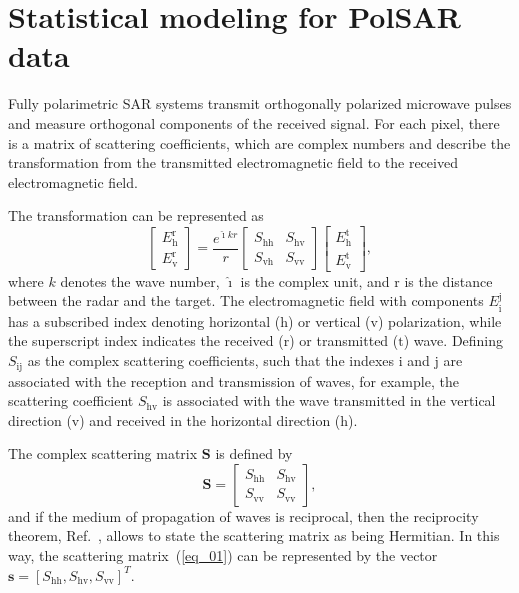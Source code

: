 \documentclass[conference]{IEEEtran}
\begin{document}
\section{Statistical modeling for PolSAR data}\label{sec_02}

Fully polarimetric SAR systems transmit orthogonally polarized microwave pulses and measure orthogonal components of the received signal. 
For each pixel, there is a matrix of scattering coefficients, which are complex numbers and describe the transformation from the transmitted electromagnetic field to the received electromagnetic field.

The transformation can be represented as
\begin{equation*}
 \left[
\begin{array}{c}
	E_{\text{h}}^{\text{r}}   \\
	E_{\text{v}}^{\text{r}}    
\end{array}
\right]
 = \frac{e^{\hat{\imath} kr}}{r}\left[
\begin{array}{cc}
	S_\text{hh}   & S_\text{hv}   \\
	S_\text{vh}   & S_\text{vv}   
\end{array}
\right]
 \left[
\begin{array}{c}
	E_{\text{h}}^{\text{t}}   \\
	E_{\text{v}}^{\text{t}}    
\end{array}
\right],
\end{equation*}
where $k$ denotes the wave number, $\hat{\imath}$ is the complex unit, and $\text{r}$ is the distance between the radar and the target. 
The electromagnetic field with components $E_{\text{i}}^{\text{j}}$ has a subscribed index denoting horizontal ($\text{h}$) or vertical ($\text{v}$) polarization, while the superscript index indicates the received ($\text{r}$) or transmitted ($\text{t}$) wave. 
Defining $S_\text{ij}$ as the complex scattering coefficients, such that the indexes $\text{i}$ and $\text{j}$ are associated with the reception and transmission of waves, for example, the scattering coefficient $S_\text{hv}$ is associated with the wave transmitted in the vertical direction ($\text{v}$) and received in the horizontal direction ($\text{h}$).

The complex scattering matrix $\mathbf{S}$ is defined by
\begin{equation}
\mathbf{S} = \left[
\begin{array}{cc}
	S_\text{hh}   & S_\text{hv}   \\
	S_\text{vv}   & S_\text{vv}   
\end{array}
\right],
\label{eq_01}
\end{equation}
and if the medium of propagation of waves is reciprocal, then the reciprocity theorem, Ref.~\cite{lp}, allows to state the scattering matrix as being Hermitian. 
In this way, the scattering matrix~(\ref{eq_01}) can be represented by the vector $\mathbf{s}=[S_\text{hh},S_\text{hv},S_{\text{vv}}]^T$.
\end{document}
